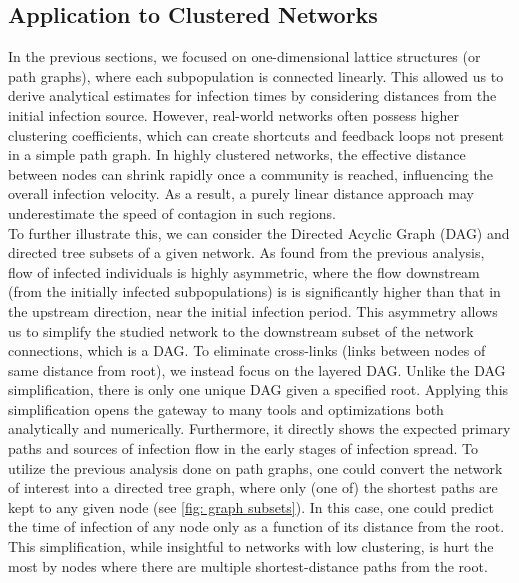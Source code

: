 \subsection{Application to Clustered Networks}
In the previous sections, we focused on one-dimensional lattice structures (or path graphs), where each subpopulation is connected linearly. This allowed us to derive analytical estimates for infection times by considering distances from the initial infection source. However, real-world networks often possess higher clustering coefficients, which can create shortcuts and feedback loops not present in a simple path graph. In highly clustered networks, the effective distance between nodes can shrink rapidly once a community is reached, influencing the overall infection velocity. As a result, a purely linear distance approach may underestimate the speed of contagion in such regions. \\

To further illustrate this, we can consider the Directed Acyclic Graph (DAG) and directed tree subsets of a given network. As found from the previous analysis, flow of infected individuals is highly asymmetric, where the flow downstream (from the initially infected subpopulations) is is significantly higher than that in the upstream direction, near the initial infection period. This asymmetry allows us to simplify the studied network to the downstream subset of the network connections, which is a DAG. To eliminate cross-links (links between nodes of same distance from root), we instead focus on the layered DAG. Unlike the DAG simplification, there is only one unique DAG given a specified root. Applying this simplification opens the gateway to many tools and optimizations both analytically and numerically. Furthermore, it directly shows the expected primary paths and sources of infection flow in the early stages of infection spread. To utilize the previous analysis done on path graphs, one could convert the network of interest into a directed tree graph, where only (one of) the shortest paths are kept to any given node (see \ref{fig: graph subsets}). In this case, one could predict the time of infection of any node only as a function of its distance from the root. This simplification, while insightful to networks with low clustering, is hurt the most by nodes where there are multiple shortest-distance paths from the root. \\

